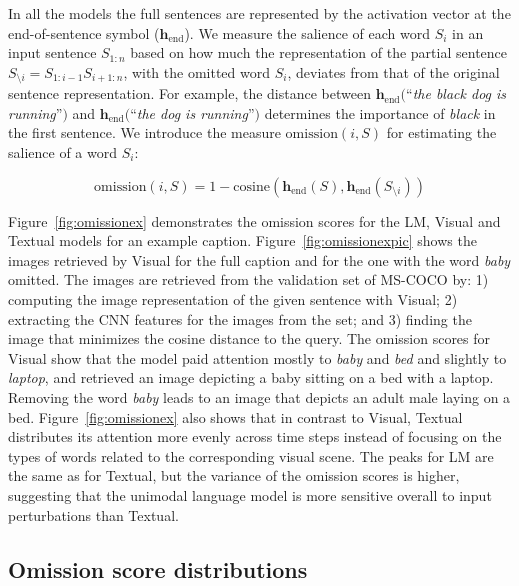 In all the models the full sentences are represented by the
activation vector at the end-of-sentence symbol
($\mathbf{h}_\text{end}$). We measure the salience of each word $S_i$
in an input sentence $S_{1:n}$ based on how much the representation of the
partial sentence $S_{\setminus i} = S_{1:i-1}S_{i+1:n}$, with
the omitted word $S_i$, deviates from that of the original sentence
representation. For example, the distance
between $\mathbf{h}_\text{end}($``{\it the black dog is running}''$)$
and $\mathbf{h}_\text{end}($``{\it the dog is running}''$)$ determines
the importance of {\it black} in the first sentence. We introduce the
measure $\mathrm{omission}(i,S)$ for estimating the salience of a word $S_i$:

\begin{equation}
\label{eg:omit}
\mathrm{omission}(i,S) = 1-\mathrm{cosine}(\mathbf{h}_\text{end}(S),
\mathbf{h}_\text{end}(S_{\setminus i}))
\end{equation}

Figure~\ref{fig:omissionex} demonstrates the omission
scores for the {\sc LM}, {\sc Visual} and {\sc Textual} models for an
example caption.
Figure~\ref{fig:omissionexpic} shows the images retrieved by {\sc
  Visual} for the full
caption and for the one with the word {\it baby} omitted.
The images are retrieved from the validation set of MS-COCO by: 1)
computing the image representation of the given sentence with {\sc
  Visual}; 2) extracting the CNN features for the images from the set;
and 3) finding the image that minimizes the cosine distance to the
query.\label{edit:retrievalexplain}
The omission scores for {\sc Visual} show that the model paid attention
mostly to {\it baby} and {\it bed} and slightly to {\it laptop}, and
retrieved an image depicting a baby sitting on a bed with a laptop.
Removing the word {\it baby} leads to an image that depicts an adult
male laying on a bed. Figure~\ref{fig:omissionex} also shows that in
contrast to {\sc Visual}, {\sc Textual} distributes
its attention more evenly across time steps instead of focusing on the
types of words related to the corresponding visual scene. The peaks
for {\sc LM} are the same as for {\sc Textual}, but the variance of
the omission scores is higher, suggesting that the unimodal language
model is more sensitive overall to input perturbations than {\sc Textual}.




\subsection{Omission score distributions}
\label{sec:omitimaginet}


